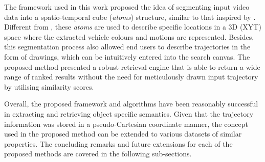The framework used in this work proposed the idea of segmenting input video data into a spatio-temporal cube (\textit{atoms}) structure, similar to that inspired by \cite{castanon2016retrieval}. Different from \cite{castanon2016retrieval}, these \textit{atoms} are used to describe specific locations in a 3D (XYT) space where the extracted vehicle colours and motions are represented. %
Besides, this segmentation process also allowed end users to describe trajectories in the form of drawings, which can be intuitively entered into the search canvas. 
The proposed method presented a robust retrieval engine that is able to return a wide range of ranked results without the need for meticulously drawn input trajectory by utilising similarity scores. 

Overall, the proposed framework and algorithms have been reasonably successful in extracting and retrieving object specific semantics. Given that the trajectory information was stored in a pseudo-Cartesian coordinate manner, the concept used in the proposed method can be extended to various datasets of similar properties. The concluding remarks and future extensions for each of the proposed methods are covered in the following sub-sections.

\vspace{1em}
